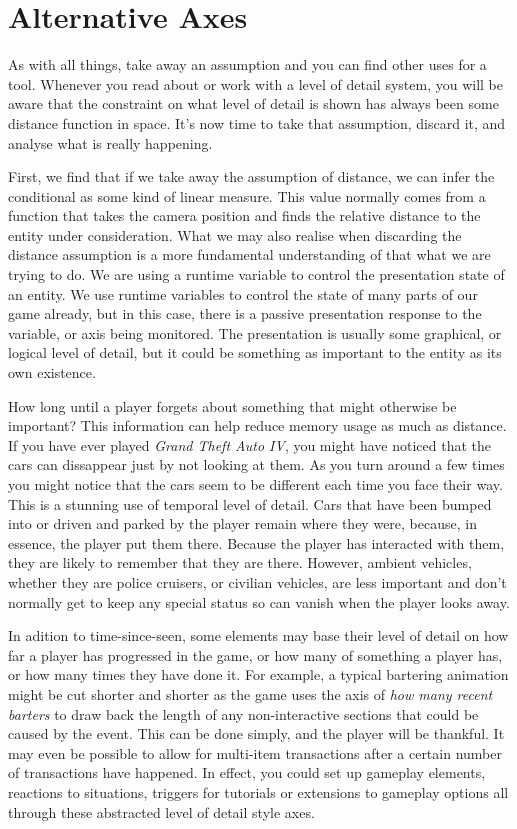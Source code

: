 \section{Alternative Axes}

As with all things, take away an assumption and you can find other uses for a
tool. Whenever you read about or work with a level of detail system, you will
be aware that the constraint on what level of detail is shown has always been
some distance function in space. It's now time to take that assumption, discard
it, and analyse what is really happening.

First, we find that if we take away the assumption of distance, we can infer
the conditional as some kind of linear measure. This value normally comes from
a function that takes the camera position and finds the relative distance to
the entity under consideration. What we may also realise when discarding the
distance assumption is a more fundamental understanding of that what we are
trying to do.  We are using a runtime variable to control the presentation
state of an entity. We use runtime variables to control the state of many parts
of our game already, but in this case, there is a passive presentation response
to the variable, or axis being monitored. The presentation is usually some
graphical, or logical level of detail, but it could be something as important
to the entity as its own existence.

How long until a player forgets about something that might otherwise be
important? This information can help reduce memory usage as much as distance.
If you have ever played {\em Grand Theft Auto IV}, you might have noticed that
the cars can dissappear just by not looking at them. As you turn around a few
times you might notice that the cars seem to be different each time you face
their way.  This is a stunning use of temporal level of detail. Cars that have
been bumped into or driven and parked by the player remain where they were,
because, in essence, the player put them there. Because the player has
interacted with them, they are likely to remember that they are there.
However, ambient vehicles, whether they are police cruisers, or civilian
vehicles, are less important and don't normally get to keep any special status
so can vanish when the player looks away.

In adition to time-since-seen, some elements may base their level of detail on
how far a player has progressed in the game, or how many of something a player
has, or how many times they have done it. For example, a typical bartering
animation might be cut shorter and shorter as the game uses the axis of {\em
how many recent barters} to draw back the length of any non-interactive
sections that could be caused by the event. This can be done simply, and the
player will be thankful.  It may even be possible to allow for multi-item
transactions after a certain number of transactions have happened. In effect,
you could set up gameplay elements, reactions to situations, triggers for
tutorials or extensions to gameplay options all through these abstracted level
of detail style axes.

